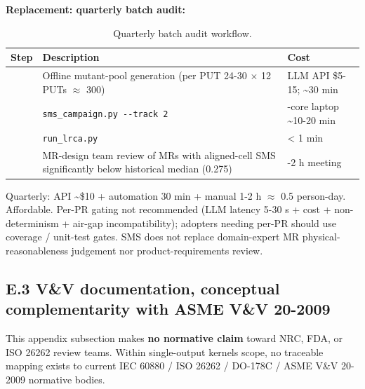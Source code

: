 \documentclass[acmsmall,screen,review]{acmart}
\begin{document}
\textbf{Replacement: quarterly batch audit:}

{\def\LTcaptype{table} %
\begin{longtable}[]{@{}
  >{\raggedright\arraybackslash}p{}
  >{\raggedright\arraybackslash}p{}
  >{\raggedright\arraybackslash}p{}@{}}
\caption{Quarterly batch audit workflow.}\label{tab:p2-26}\\
\toprule\noalign{}
\begin{minipage}[b]{\linewidth}\raggedright
Step
\end{minipage} & \begin{minipage}[b]{\linewidth}\raggedright
Description
\end{minipage} & \begin{minipage}[b]{\linewidth}\raggedright
Cost
\end{minipage} \\
\midrule\noalign{}
\endfirsthead
\endhead
\bottomrule\noalign{}
\endlastfoot
1 & Offline mutant-pool generation (per PUT 24-30 $\times$ 12 PUTs $\approx$ 300) & LLM
API \$5-15; \textasciitilde30 min \\
2 & \texttt{sms\_campaign.py\ -\/-track\ 2} & 4-core laptop
\textasciitilde10-20 min \\
3 & \texttt{run\_lrca.py} & \textless{} 1 min \\
4 & MR-design team review of MRs with aligned-cell SMS significantly
below historical median (0.275) & 1-2 h meeting \\
\end{longtable}
}

Quarterly: API \textasciitilde\$10 + automation 30 min + manual 1-2 h $\approx$
0.5 person-day. Affordable. Per-PR gating not recommended (LLM latency
5-30 s + cost + non-determinism + air-gap incompatibility); adopters
needing per-PR should use coverage / unit-test gates. SMS does not
replace domain-expert MR physical-reasonableness judgement nor
product-requirements review.

\subsection{E.3 V\&V documentation, conceptual complementarity with ASME V\&V 20-2009}\label{e.3-vv-documentation-conceptual-complementarity-with-asme-vv-20-2009}

This appendix subsection makes \textbf{no normative claim} toward NRC,
FDA, or ISO 26262 review teams. Within single-output kernels scope, no
traceable mapping exists to current IEC 60880 / ISO 26262 / DO-178C /
ASME V\&V 20-2009 normative bodies.
\end{document}
